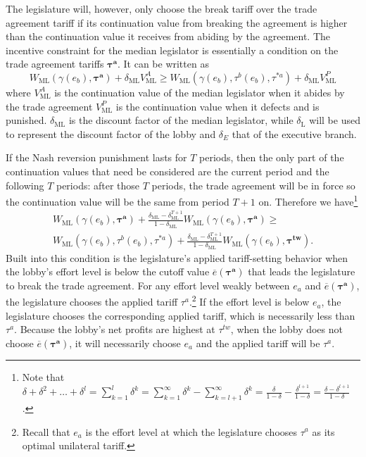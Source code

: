 \documentclass[authoryear, review]{elsarticle}
\newcommand{\ov}{\overline}
\newcommand{\bta}{\bm{\tau^a}}
\newcommand{\ga}{\gamma}
\newcommand{\btw}{\bm{\tau^{tw}}}
\newcommand{\de}{\delta}
\begin{document}
The legislature will, however, only choose the break tariff over the trade agreement tariff if its continuation value from breaking the agreement is higher than the continuation value it receives from abiding by the agreement. The incentive constraint for the median legislator is essentially a condition on the trade agreement tariffs $\bta$. It can be written as
\[
  W_\text{ML}(\ga(e_b),\bta) + \de_\text{ML} V^A_\text{ML} \geq W_\text{ML}(\ga(e_b),\tau^b(e_b),\tau^{*a}) + \de_\text{ML} V^P_\text{ML}
\]
where $V^A_\text{ML}$ is the continuation value of the median legislator when it abides by the trade agreement $V^P_\text{ML}$ is the continuation value when it defects and is punished. $\de_\text{ML}$ is the discount factor of the median legislator, while $\de_\text{L}$ will be used to represent the discount factor of the lobby and $\de_E$ that of the executive branch.

If the Nash reversion punishment lasts for $T$ periods, then the only part of the continuation values that need be considered are the current period and the following $T$ periods: after those $T$ periods, the trade agreement will be in force so the continuation value will be the same from period $T+1$ on. Therefore we have\footnote{Note that $\de + \de^2 + \ldots + \de^l = \sum_{k=1}^l \de^k= \sum_{k=1}^\infty \de^k - \sum_{k=l+1}^\infty \de^k = \frac{\de}{1-\de} - \frac{\de^{l+1}}{1-\de} = \frac{\de - \de^{l+1}}{1-\de} $.}
\begin{multline}
  W_\text{ML}(\ga(e_b),\bta) + \frac{\de_\text{ML} - \de_\text{ML}^{T+1}}{1-\de_\text{ML}} W_\text{ML}(\ga(e_b),\bta) \geq \\
	W_\text{ML}(\ga(e_b),\tau^b(e_b),\tau^{*a}) + \frac{\de_\text{ML} - \de_\text{ML}^{T+1}}{1-\de_\text{ML}} W_\text{ML}(\ga(e_b),\btw).
  \label{ine:leg}
\end{multline}
Built into this condition is the legislature's applied tariff-setting behavior when the lobby's effort level is below the cutoff value $\ov{e}(\bta)$ that leads the legislature to break the trade agreement. For any effort level weakly between $e_a$ and $\ov{e}(\bta)$, the legislature chooses the applied tariff $\tau^a$.\footnote{Recall that $e_a$ is the effort level at which the legislature chooses $\tau^a$ as its optimal unilateral tariff.} If the effort level is below $e_a$, the legislature chooses the corresponding applied tariff, which is necessarily less than $\tau^a$. Because the lobby's net profits are highest at $\tau^{tw}$, when the lobby does not choose $\ov{e}(\bta)$, it will necessarily choose $e_a$ and the applied tariff will be $\tau^a$.
\end{document}
